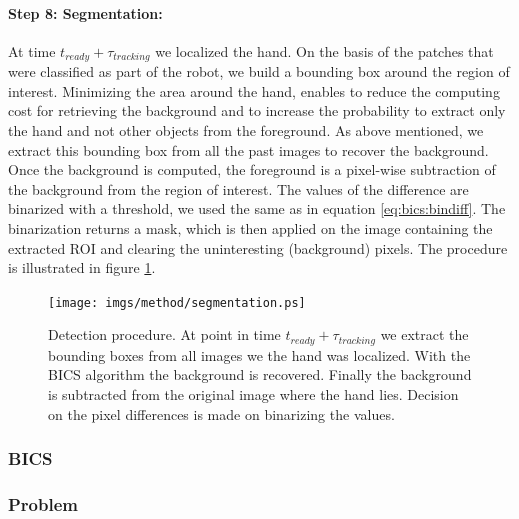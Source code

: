\paragraph{Step 8: Segmentation:}
\label{halose:se8}
% 
At time $t_{ready}+ \tau_{tracking}$ we localized the hand. On the basis of the patches that were classified as part of the robot, we build a bounding box around the region of interest. Minimizing the area around the hand, enables to reduce the computing cost for retrieving the background and to increase the probability to extract only the hand and not other objects from the foreground. As above mentioned, we extract this bounding box from all the past images to recover the background. Once the background is computed, the foreground is a pixel-wise subtraction of the background from the region of interest. The values of the difference are binarized with a threshold, we used the same as in equation \ref{eq:bics:bindiff}. The binarization returns a mask, which is then applied on the image containing the extracted ROI and clearing the uninteresting (background) pixels. The procedure is illustrated in figure \ref{fig:segmentation}.
%
\begin{figure}[ht]
	\begin{center}
		\texttt{[image: imgs/method/segmentation.ps]}
	\end{center}
		\caption[Detection procedure. ]{Detection procedure. At point in time $t_{ready}+ \tau_{tracking}$ we extract the bounding boxes from all images we the hand was localized. With the BICS algorithm the background is recovered. Finally the background is subtracted from the original image where the hand lies. Decision on the pixel differences is made on binarizing the values.}
		\label{fig:segmentation}
\end{figure}
%
\subsubsection{BICS}
\subsubsection{Problem}
